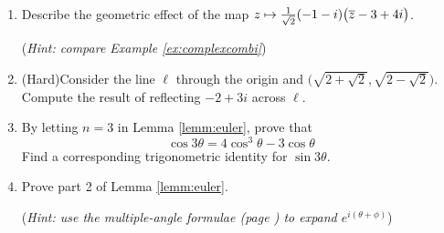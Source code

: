 \begin{exercises}
\begin{enumerate}
  
  \item Describe the geometric effect of the map $z\mapsto \frac 1{\sqrt 2}(-1-i)\bigl(\overline{z}-3+4i\bigr)$.\par
  (\emph{Hint: compare Example \ref{ex:complexcombi}})
  
  
  \item (Hard)\lstsp Consider the line $\ell$ through the origin and $\bigl(\sqrt{2+\sqrt 2},\sqrt{2-\sqrt 2}\bigr)$. Compute the result of reflecting $-2+3i$ across $\ell$.
    
      
  \item By letting $n=3$ in Lemma \ref{lemm:euler}, prove that 
  	\[\cos 3\theta=4\cos^3\!\theta-3\cos\theta\]
  	Find a corresponding trigonometric identity for $\sin 3\theta$.
  	
  	
  \item Prove part 2 of Lemma \ref{lemm:euler}.\par
  (\emph{Hint: use the multiple-angle formulae (page \pageref{sec:multangle}) to expand $e^{i(\theta+\phi)}$})
  	
 	
\end{enumerate}
 	
  
  

\end{exercises}
